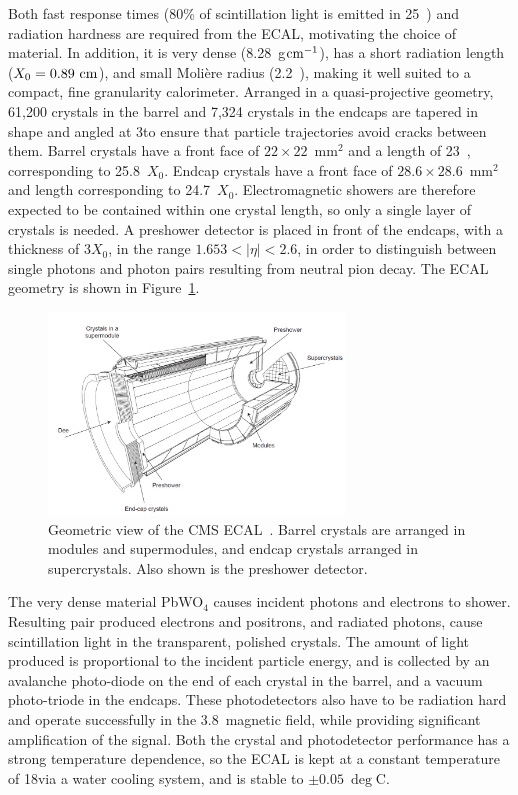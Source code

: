Both fast response times (80\% of scintillation light is emitted in 25~\ns) and radiation hardness are required from the \ac{ECAL}, motivating the choice of material.
In addition, it is very dense (8.28~g$\mathrm{cm}^{-1}$), has a short radiation length ($X_{0} = 0.89~\mathrm{cm}$), and small Moli\`{e}re radius (2.2~\cm), making it well suited to a compact, fine granularity calorimeter.
Arranged in a quasi-projective geometry, 61,200 crystals in the barrel and 7,324 crystals in the endcaps are tapered in shape and angled at 3\deg to ensure that particle trajectories avoid cracks between them.
Barrel crystals have a front face of $22 \times 22$~mm$^{2}$ and a length of 23~\cm, corresponding to 25.8~$X_{0}$. 
Endcap crystals have a front face of $28.6 \times 28.6$~mm$^{2}$ and length corresponding to 24.7~$X_{0}$.
Electromagnetic showers are therefore expected to be contained within one crystal length, so only a single layer of crystals is needed. 
A preshower detector is placed in front of the endcaps, with a thickness of $3X_{0}$, in the range $1.653<|\eta|<2.6$, in order to distinguish between single photons and photon pairs resulting from neutral pion decay. 
The \ac{ECAL} geometry is shown in Figure~\ref{fig:CMSecal}.

\begin{figure}[htbp]
  \begin{center}
  \includegraphics[width=0.7\textwidth]{Figures/detector/cmsECAL}
  \caption{Geometric view of the \ac{CMS} \ac{ECAL}~\cite{Chatrchyan:2008zzk}. Barrel crystals are arranged in modules and supermodules, and endcap crystals arranged in supercrystals. Also shown is the preshower detector.
}
  \label{fig:CMSecal}
  \end{center}
\end{figure}

The very dense material PbWO$_{4}$ causes incident photons and electrons to shower. 
Resulting pair produced electrons and positrons, and radiated photons, cause scintillation light in the transparent, polished crystals. 
The amount of light produced is proportional to the incident particle energy, and is collected by an avalanche photo-diode %
 on the end of each crystal in the barrel, and a vacuum photo-triode %
in the endcaps. %
These photodetectors also have to be radiation hard and operate successfully in the 3.8~\T magnetic field, while providing significant amplification of the signal.
Both the crystal and photodetector performance has a strong temperature dependence, so the \ac{ECAL} is kept at a constant temperature of 18\deg via a water cooling system, and is stable to $\pm0.05~\deg$C.

